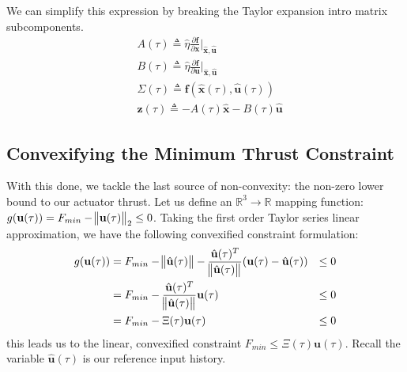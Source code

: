 We can simplify this expression by breaking the Taylor expansion intro matrix subcomponents. 
\begin{align}
& A(\tau) \triangleq \hat{\eta} \frac{\partial \mathbf{f}}{\partial \mathbf{x}}  \bigg\rvert_{\mathbf{\hat{x}}, \mathbf{\hat{u}}} \\
& B(\tau) \triangleq \hat{\eta} \frac{\partial \mathbf{f}}{\partial \mathbf{u}}  \bigg\rvert_{\mathbf{\hat{x}}, \mathbf{\hat{u}}} \\
& \Sigma(\tau) \triangleq \mathbf{f}(\hat{\mathbf{x}}(\tau), \hat{\mathbf{u}}(\tau)) \\
& \mathbf{z}(\tau) \triangleq -A(\tau)\mathbf{\hat{x}}- B(\tau)\mathbf{\hat{u}}
\end{align}


\subsection{Convexifying the Minimum Thrust Constraint}
With this done, we tackle the last source of non-convexity: the non-zero lower bound to our actuator thrust. Let us define an $\mathbb{R}^3 \rightarrow \mathbb{R}$ mapping function: $g(\mathbf{u}(\tau)) = F_{min} - \norm{\mathbf{u}(\tau)}_2 \leq 0$. Taking the first order Taylor series linear approximation, we have the following convexified constraint formulation:
%
\begin{align}
	g(\mathbf{u}(\tau)) &= F_{min} - \norm{\hat{\mathbf{u}}(\tau)} - \frac{\hat{\mathbf{u}}(\tau)^T}{\norm{\hat{\mathbf{u}}(\tau)}}(\mathbf{u}(\tau) - \hat{\mathbf{u}}(\tau)) & \leq 0 \\
	&= F_{min} - \frac{\hat{\mathbf{u}}(\tau)^T}{\norm{\hat{\mathbf{u}}(\tau)}} \mathbf{u}(\tau)  & \leq 0\\
	&= F_{min} - \Xi(\tau)\mathbf{u}(\tau)  & \leq 0
\end{align}
this leads us to the linear, convexified constraint $F_{min} \leq \Xi(\tau)\mathbf{u}(\tau)$. Recall the variable $\hat{\mathbf{u}}(\tau)$ is our reference input history.







